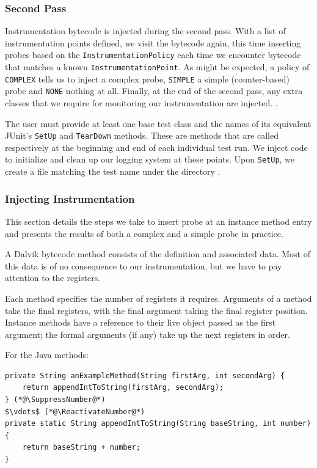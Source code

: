 \subsubsection{Second Pass}

Instrumentation bytecode is injected during the second pass. With a list of instrumentation points defined, we visit the bytecode again, this time inserting probes based on the {\tt InstrumentationPolicy} each time we encounter bytecode that matches a known {\tt InstrumentationPoint}. As might be expected, a policy of {\tt COMPLEX} tells us to inject a complex probe, {\tt SIMPLE} a simple (counter-based) probe and {\tt NONE} nothing at all. Finally, at the end of the second pass, any extra classes that we require for monitoring our instrumentation are injected. .

The user must provide at least one base test class and the names of its equivalent JUnit's {\tt SetUp} and {\tt TearDown} methods. These are methods that are called respectively at the beginning and end of each individual test run. We inject code to initialize and clean up our logging system at these points. Upon {\tt SetUp}, we create a file matching the test name  under the directory .

\subsubsection{Injecting Instrumentation}

This section details the steps we take to insert probe at an instance method entry and presents the results of both a complex and a simple probe in practice.

A Dalvik bytecode method consists of the definition and associated data. Most of this data is of no consequence to our instrumentation, but we have to pay attention to the registers.

Each method specifies the number of registers it requires. Arguments of a method take the final registers, with the final argument taking the final register position. Instance methods have a reference to their live object passed as the first argument; the formal arguments (if any) take up the next registers in order.

For the Java methods:

\begin{lstlisting}[mathescape, numberblanklines=false]
private String anExampleMethod(String firstArg, int secondArg) {
    return appendIntToString(firstArg, secondArg);
} (*@\SuppressNumber@*)
$\vdots$ (*@\ReactivateNumber@*)
private static String appendIntToString(String baseString, int number) {
    return baseString + number;
}
\end{lstlisting}

